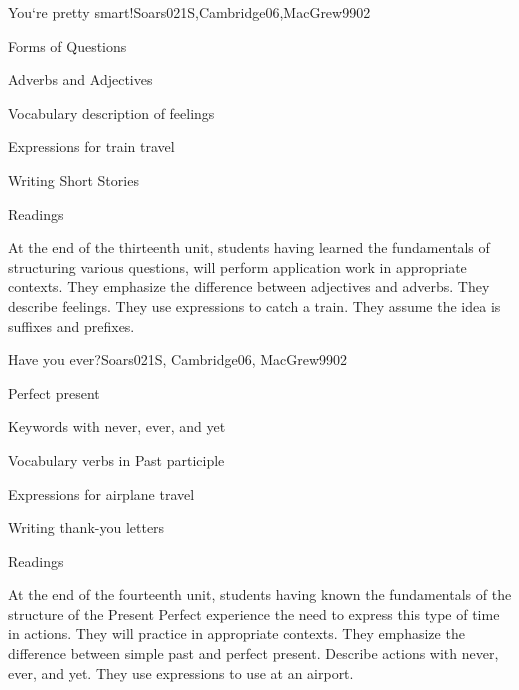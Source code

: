 \begin{syllabus}
\begin{unit}{You`re pretty smart!}{}{Soars021S,Cambridge06,MacGrew99}{0}{2}
\begin{topics}
      \item Forms of Questions
      \item Adverbs and Adjectives
      \item Vocabulary description of feelings
      \item Expressions for train travel
      \item Writing Short Stories
      \item Readings
   \end{topics}

   \begin{learningoutcomes}
      \item At the end of the thirteenth unit, students having learned the fundamentals of structuring various questions, will perform application work in appropriate contexts. They emphasize the difference between adjectives and adverbs. They describe feelings. They use expressions to catch a train. They assume the idea is suffixes and prefixes.
   \end{learningoutcomes}

\end{unit}

\begin{unit}{Have you ever?}{}{Soars021S, Cambridge06, MacGrew99}{0}{2}
   \begin{topics}
      \item Perfect present
      \item Keywords with never, ever, and yet
      \item Vocabulary verbs in Past participle
      \item Expressions for airplane travel
      \item Writing thank-you letters
      \item Readings
   \end{topics}

   \begin{learningoutcomes}
      \item At the end of the fourteenth unit, students having known the fundamentals of the structure of the Present Perfect experience the need to express this type of time in actions. They will practice in appropriate contexts. They emphasize the difference between simple past and perfect present. Describe actions with never, ever, and yet. They use expressions to use at an airport.
   \end{learningoutcomes}

\end{unit}

\begin{coursebibliography}
\end{coursebibliography}

\end{syllabus}
%
